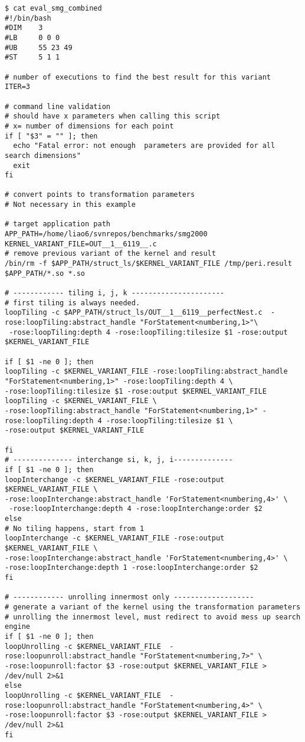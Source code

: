 {\scriptsize
\begin{verbatim}  
$ cat eval_smg_combined
#!/bin/bash
#DIM    3
#LB     0 0 0
#UB     55 23 49
#ST     5 1 1

# number of executions to find the best result for this variant
ITER=3

# command line validation
# should have x parameters when calling this script
# x= number of dimensions for each point
if [ "$3" = "" ]; then
  echo "Fatal error: not enough  parameters are provided for all search dimensions"
  exit
fi

# convert points to transformation parameters
# Not necessary in this example

# target application path
APP_PATH=/home/liao6/svnrepos/benchmarks/smg2000
KERNEL_VARIANT_FILE=OUT__1__6119__.c
# remove previous variant of the kernel and result
/bin/rm -f $APP_PATH/struct_ls/$KERNEL_VARIANT_FILE /tmp/peri.result $APP_PATH/*.so *.so

# ------------ tiling i, j, k ----------------------
# first tiling is always needed.
loopTiling -c $APP_PATH/struct_ls/OUT__1__6119__perfectNest.c  -rose:loopTiling:abstract_handle "ForStatement<numbering,1>"\
 -rose:loopTiling:depth 4 -rose:loopTiling:tilesize $1 -rose:output $KERNEL_VARIANT_FILE

if [ $1 -ne 0 ]; then
loopTiling -c $KERNEL_VARIANT_FILE -rose:loopTiling:abstract_handle "ForStatement<numbering,1>" -rose:loopTiling:depth 4 \
-rose:loopTiling:tilesize $1 -rose:output $KERNEL_VARIANT_FILE loopTiling -c $KERNEL_VARIANT_FILE \
-rose:loopTiling:abstract_handle "ForStatement<numbering,1>" -rose:loopTiling:depth 4 -rose:loopTiling:tilesize $1 \
-rose:output $KERNEL_VARIANT_FILE

fi
# -------------- interchange si, k, j, i--------------
if [ $1 -ne 0 ]; then
loopInterchange -c $KERNEL_VARIANT_FILE -rose:output $KERNEL_VARIANT_FILE \
-rose:loopInterchange:abstract_handle 'ForStatement<numbering,4>' \
 -rose:loopInterchange:depth 4 -rose:loopInterchange:order $2
else
# No tiling happens, start from 1
loopInterchange -c $KERNEL_VARIANT_FILE -rose:output $KERNEL_VARIANT_FILE \
-rose:loopInterchange:abstract_handle 'ForStatement<numbering,4>' \
-rose:loopInterchange:depth 1 -rose:loopInterchange:order $2
fi

# ------------ unrolling innermost only -------------------
# generate a variant of the kernel using the transformation parameters
# unrolling the innermost level, must redirect to avoid mess up search engine
if [ $1 -ne 0 ]; then
loopUnrolling -c $KERNEL_VARIANT_FILE  -rose:loopunroll:abstract_handle "ForStatement<numbering,7>" \
-rose:loopunroll:factor $3 -rose:output $KERNEL_VARIANT_FILE > /dev/null 2>&1
else
loopUnrolling -c $KERNEL_VARIANT_FILE  -rose:loopunroll:abstract_handle "ForStatement<numbering,4>" \
-rose:loopunroll:factor $3 -rose:output $KERNEL_VARIANT_FILE > /dev/null 2>&1
fi


\end{verbatim}}
